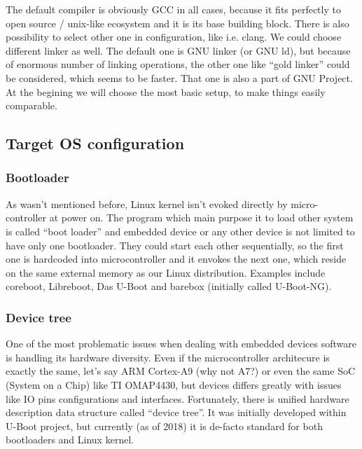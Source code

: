\documentclass[printmode]{mgr}
\begin{document}
The default compiler is obviously GCC in all cases, because it fits perfectly to open source / unix-like ecosystem and it is its base building block. There is also possibility to select other one in configuration, like i.e. clang. We could choose different linker as well. The default one is GNU linker (or GNU ld), but because of enormous number of linking operations, the other one like ``gold linker'' could be considered, which seems to be faster. That one is also a part of GNU Project. At the begining we will choose the most basic setup, to make things easily comparable. %

\subsection{Target OS configuration}

\subsubsection{Bootloader}
As wasn't mentioned before, Linux kernel isn't evoked directly by micro-controller at power on. The program which main purpose it to load other system is called ``boot loader'' and embedded device or any other device is not limited to have only one bootloader. They could start each other sequentially, so the first one is hardcoded into microcontroller and it envokes the next one, which reside on the same external memory as our Linux distribution. Examples include coreboot, Libreboot, Das U-Boot and barebox (initially called U-Boot-NG).

\subsubsection{Device tree}
One of the most problematic issues when dealing with embedded devices software is handling its hardware diversity. Even if the microcontroller architecure is exactly the same, let's say ARM Cortex-A9 (why not A7?) or even the same SoC (System on a Chip) like TI OMAP4430, but devices differs greatly with issues like IO pins configurations and interfaces. Fortunately, there is unified hardware description data structure called ``device tree''. It was initially developed within U-Boot project, but currently (as of 2018) it is de-facto standard for both bootloaders and Linux kernel.
\end{document}
